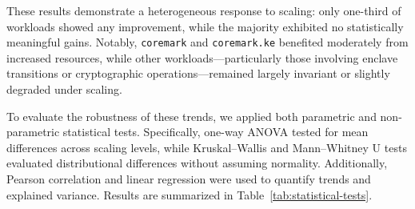 These results demonstrate a heterogeneous response to scaling: only one-third of workloads showed any improvement, while the majority exhibited no statistically meaningful gains. Notably, \texttt{coremark} and \texttt{coremark.ke} benefited moderately from increased resources, while other workloads—particularly those involving enclave transitions or cryptographic operations—remained largely invariant or slightly degraded under scaling.

To evaluate the robustness of these trends, we applied both parametric and non-parametric statistical tests. Specifically, one-way ANOVA tested for mean differences across scaling levels, while Kruskal–Wallis and Mann–Whitney U tests evaluated distributional differences without assuming normality. Additionally, Pearson correlation and linear regression were used to quantify trends and explained variance. Results are summarized in Table~\ref{tab:statistical-tests}.

